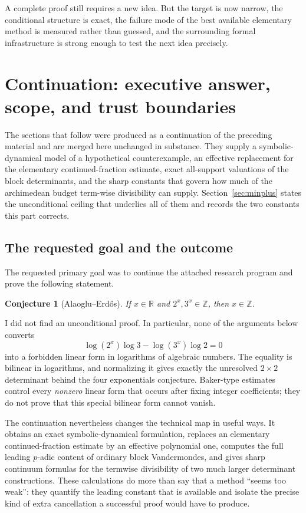 \documentclass[11pt,oneside]{article}
\newtheorem{conjecture}[theorem]{Conjecture}
\theoremstyle{definition}
\theoremstyle{remark}
\newcommand{\Z}{\mathbb Z}
\newcommand{\R}{\mathbb R}
\begin{document}
A complete proof still requires a new idea.  But the target is now narrow, the conditional
structure is exact, the failure mode of the best available elementary method is measured
rather than guessed, and the surrounding formal infrastructure is strong enough to test the
next idea precisely.
\clearpage
{}

\section{Continuation: executive answer, scope, and trust boundaries}
\label{sec:continuation}

The sections that follow were produced as a continuation of the preceding material and
are merged here unchanged in substance.  They supply a symbolic-dynamical model of a
hypothetical counterexample, an effective replacement for the elementary
continued-fraction estimate, exact all-support valuations of the block determinants, and
the sharp constants that govern how much of the archimedean budget term-wise divisibility
can supply.  Section~\ref{sec:minplus} states the unconditional ceiling that
underlies all of them and records the two constants this part corrects.


\subsection{The requested goal and the outcome}

The requested primary goal was to continue the attached research program and prove the
following statement.

\begin{conjecture}[Alaoglu--Erd\H{o}s]
If $x\in\R$ and $2^x,3^x\in\Z$, then $x\in\Z$.
\end{conjecture}

I did not find an unconditional proof.  In particular, none of the arguments below converts
\[
  \log(2^x)\log3-\log(3^x)\log2=0
\]
into a forbidden linear form in logarithms of algebraic numbers.  The equality is bilinear in
logarithms, and normalizing it gives exactly the unresolved $2\times2$ determinant behind the
four exponentials conjecture.  Baker-type estimates control every \emph{nonzero} linear form
that occurs after fixing integer coefficients; they do not prove that this special bilinear
form cannot vanish.

The continuation nevertheless changes the technical map in useful ways.  It obtains an exact
symbolic-dynamical formulation, replaces an elementary continued-fraction estimate by an
effective polynomial one, computes the full leading $p$-adic content of ordinary block
Vandermondes, and gives sharp continuum formulas for the termwise divisibility of two much
larger determinant constructions.  These calculations do more than say that a method ``seems
too weak'': they quantify the leading constant that is available and isolate the precise
kind of extra cancellation a successful proof would have to produce.
\end{document}
